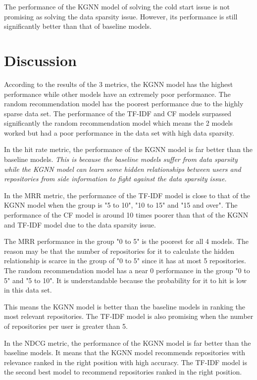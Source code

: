 \documentclass[11pt,twoside]{report}
\begin{document}
The performance of the KGNN model of solving the cold start issue is not promising as solving the data sparsity issue. However, its performance is still significantly better than that of baseline models.

\section{Discussion}
According to the results of the 3 metrics, the KGNN model has the highest performance while other models have an extremely poor performance. The random recommendation model has the poorest performance due to the highly sparse data set. The performance of the TF-IDF and CF models surpassed significantly the random recommendation model which means the 2 models worked but had a poor performance in the data set with high data sparsity.

In the hit rate metric, the performance of the KGNN model is far better than the baseline models. \textit{This is because the baseline models suffer from data sparsity while the KGNN model can learn some hidden relationships between users and repositories from side information to fight against the data sparsity issue.}

In the MRR metric, the performance of the TF-IDF model is close to that of the KGNN model when the group is "5 to 10", "10 to 15" and "15 and over". The performance of the CF model is around 10 times poorer than that of the KGNN and TF-IDF model due to the data sparsity issue.

The MRR performance in the group "0 to 5" is the poorest for all 4 models. The reason may be that the number of repositories for it to calculate the hidden relationship is scarce in the group of "0 to 5" since it has at most 5 repositories. The random recommendation model has a near 0 performance in the group "0 to 5" and "5 to 10". It is understandable because the probability for it to hit is low in this data set.

This means the KGNN model is better than the baseline models in ranking the most relevant repositories. The TF-IDF model is also promising when the number of repositories per user is greater than 5.

In the NDCG metric, the performance of the KGNN model is far better than the baseline models. It means that the KGNN model recommends repositories with relevance ranked in the right position with high accuracy. The TF-IDF model is the second best model to recommend repositories ranked in the right position.
\end{document}
